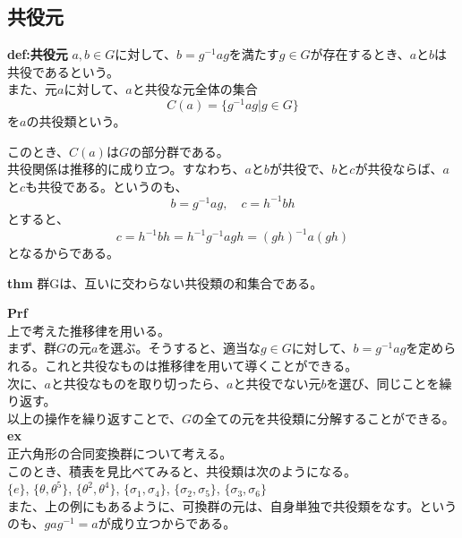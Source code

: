 \documentclass[a4paper,11pt]{jsarticle}
\begin{document}
\subsection{共役元}
\begin{itembox}[l]{\textbf{def:共役元}}
    $a,b \in G$に対して、$b = g^{-1}ag$を満たす$g \in G$が存在するとき、$a$と$b$は共役であるという。\\
    また、元$a$に対して、$a$と共役な元全体の集合
    \begin{equation}
        C(a) = \{g^{-1}ag | g \in G\}
    \end{equation}
    を$a$の共役類という。
\end{itembox}
このとき、$C(a)$は$G$の部分群である。\\
共役関係は推移的に成り立つ。すなわち、$a$と$b$が共役で、$b$と$c$が共役ならば、$a$と$c$も共役である。というのも、
\begin{equation}
    b = g^{-1}ag, \quad c = h^{-1}bh
\end{equation}
とすると、
\begin{equation}
    c = h^{-1}bh = h^{-1}g^{-1}agh = (gh)^{-1}a(gh)
\end{equation}
となるからである。\\
\begin{itembox}[l]{\textbf{thm}}
群Gは、互いに交わらない共役類の和集合である。
\end{itembox}
\textbf{Prf}\\
上で考えた推移律を用いる。\\
まず、群$G$の元$a$を選ぶ。そうすると、適当な$g \in G$に対して、$b = g^{-1}ag$を定められる。これと共役なものは推移律を用いて導くことができる。\\
次に、$a$と共役なものを取り切ったら、$a$と共役でない元$b$を選び、同じことを繰り返す。\\
以上の操作を繰り返すことで、$G$の全ての元を共役類に分解することができる。\\

\textbf{ex}\\
正六角形の合同変換群について考える。\\%
このとき、積表を見比べてみると、共役類は次のようになる。\\
$\{e\}$, $\{\theta,\theta^5\}$, $\{\theta^2,\theta^4\}$, $\{\sigma_1,\sigma_4\}$, $\{\sigma_2,\sigma_5\}$, $\{\sigma_3,\sigma_6\}$\\
また、上の例にもあるように、可換群の元は、自身単独で共役類をなす。というのも、$gag^{-1} = a$が成り立つからである。\\
\end{document}

